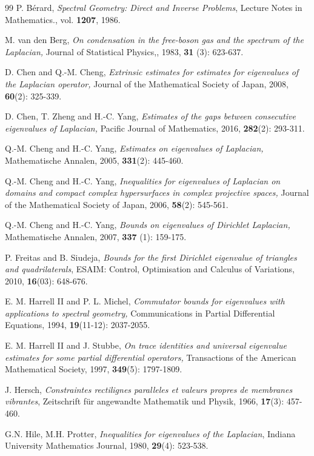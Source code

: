 \documentclass[12pt]{article}
\numberwithin{equation}{section}
\begin{document}
\begin{thebibliography}{99}
P. B\'{e}rard, {\it Spectral Geometry: Direct and Inverse Problems},
Lecture Notes in Mathematics., vol. {\bf 1207}, 1986.

M. van den Berg, {\it On condensation in the free-boson gas and the spectrum of the Laplacian,} Journal of Statistical Physics,, 1983, {\bf 31} (3): 623-637.

D. Chen and Q.-M. Cheng, {\it Extrinsic estimates for estimates for eigenvalues of the Laplacian operator,} Journal of the Mathematical Society of Japan, 2008, {\bf 60}(2): 325-339.

D. Chen, T. Zheng and H.-C. Yang, {\it Estimates of the gaps between consecutive eigenvalues of Laplacian,} Pacific Journal of Mathematics, 2016, {\bf 282}(2): 293-311.

Q.-M. Cheng and H.-C. Yang, {\it Estimates on eigenvalues of
Laplacian,} Mathematische Annalen, 2005, \textbf{331}(2): 445-460.

Q.-M. Cheng and H.-C. Yang, {\it Inequalities for eigenvalues of Laplacian on domains and compact
complex hypersurfaces in complex projective spaces,} Journal of the Mathematical Society of Japan, 2006, {\bf58}(2): 545-561.

Q.-M. Cheng and H.-C. Yang, {\it Bounds on eigenvalues of Dirichlet
Laplacian,} Mathematische Annalen, 2007, \textbf{337} (1):  159-175.

P. Freitas and B. Siudeja, {\it Bounds for the first Dirichlet eigenvalue of triangles and quadrilaterals}, ESAIM: Control, Optimisation and Calculus of Variations, 2010, {\bf 16}(03): 648-676.

E. M. Harrell II and P. L. Michel, {\it Commutator bounds for eigenvalues with applications to spectral
geometry,} Communications in Partial Differential Equations, 1994, {\bf 19}(11-12): 2037-2055.

E. M. Harrell II and J. Stubbe, {\it On trace identities and universal eigenvalue estimates for some
partial differential operators,}  Transactions of the American Mathematical Society,  1997, {\bf 349}(5): 1797-1809.

J. Hersch, {\it Constraintes rectilignes paralleles et valeurs propres de membranes vibrantes}, Zeitschrift f\"{u}r angewandte Mathematik und Physik,  1966, {\bf 17}(3):
457-460.

G.N. Hile, M.H. Protter, {\it Inequalities for eigenvalues of the Laplacian},  Indiana University Mathematics Journal, 1980,  {\bf 29}(4): 523-538.


\end{thebibliography}
\end{document}
